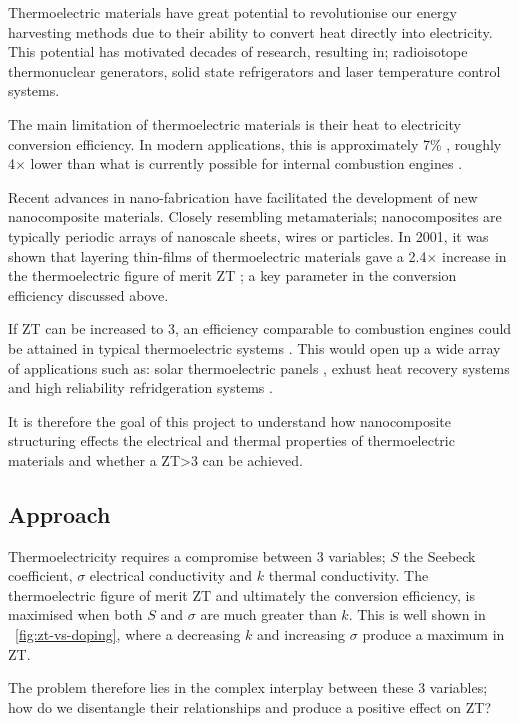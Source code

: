 \documentclass[12pt,draft]{article}
\newcommand{\figref}[2][\figurename~]{#1\ref{#2}}
\begin{document}
Thermoelectric materials have great potential to revolutionise our energy harvesting methods due to their ability to convert heat directly into electricity. This potential has motivated decades of research, resulting in;  radioisotope thermonuclear generators, solid state refrigerators and laser temperature control systems.

The main limitation of thermoelectric materials is their heat to electricity conversion efficiency. In modern applications, this is approximately 7\% \cite{modern-thermoelectrics}, roughly 4$\times$ lower than what is currently possible for internal combustion engines \cite{engine-efficiency}.

Recent advances in nano-fabrication have facilitated the development of  new nanocomposite materials. Closely resembling metamaterials; nanocomposites are typically periodic arrays of nanoscale sheets, wires or particles. In 2001, it was shown that layering thin-films of thermoelectric materials gave a 2.4$\times$ increase in the thermoelectric figure of merit ZT \cite{nanocomposite-zt}; a key parameter in the conversion efficiency discussed above.

If ZT can be increased to 3, an efficiency comparable to combustion engines could be attained in typical thermoelectric systems \cite{liu-review}. This would open up a wide array of applications such as: solar thermoelectric panels \cite{solar-thermal}, exhust heat recovery systems \cite{exhust-recovery} and high reliability refridgeration systems \cite{thermo-cooling}.

It is therefore the goal of this project to understand how nanocomposite structuring effects the electrical and thermal properties of thermoelectric materials and whether a ZT\textgreater3 can be achieved.

\subsection{Approach}
Thermoelectricity requires a compromise between 3 variables; $S$ the Seebeck coefficient, $\sigma$ electrical conductivity and $k$ thermal conductivity. The thermoelectric figure of merit ZT and ultimately the conversion efficiency, is maximised when both $S$ and $\sigma$ are much greater than $k$. This is well shown in \figref{fig:zt-vs-doping}, where a decreasing $k$ and increasing $\sigma$ produce a maximum in ZT.

The problem therefore lies in the complex interplay between these 3 variables; how do we disentangle their relationships and produce a positive effect on ZT?
\end{document}
